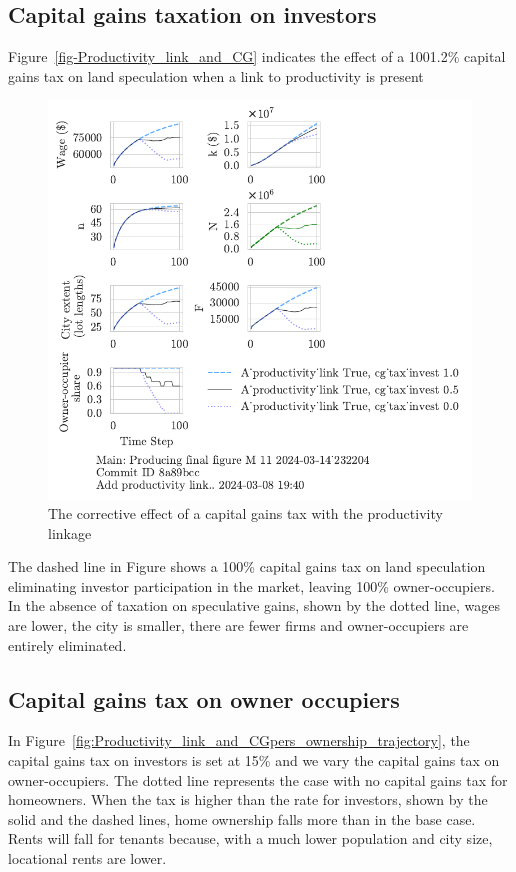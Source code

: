 \subsection{Capital gains taxation on investors}
Figure~\ref{fig-Productivity_link_and_CG} indicates the effect of a 1001.2\% capital gains tax on land speculation when a link to productivity is present

\begin{figure}[h!tb]\label{fig-Productivity_link_and_CG}
    \centering
     \includegraphics[scale=1, trim=.25cm 2cm .25cm .25cm, clip]{fig/With-productivity_linkcg_tax_invest-232204.pdf}
    \caption{The corrective effect of a capital gains tax with the productivity linkage}
    \label{fig:Productivity_link_and_CG}
\end{figure}

The dashed line in Figure shows a 100\% capital gains tax on land speculation eliminating investor participation in the market, leaving 100\%  owner-occupiers.  In the absence of taxation on speculative gains, shown by the dotted line, wages are lower, the city is smaller, there are fewer firms and owner-occupiers are entirely eliminated. 

\newpage
\subsection{Capital gains tax on owner occupiers}
In Figure~\ref{fig:Productivity_link_and_CGpers_ownership_trajectory}, the capital gains tax on investors is set at 15\% and we vary the capital gains tax on owner-occupiers. The dotted line represents the case with no capital gains tax for homeowners. When the tax is higher than the rate for investors, shown by the solid and the dashed lines,  home ownership falls more than in the base case.  Rents will fall for tenants because, with a much lower population and city size, locational rents are lower.


